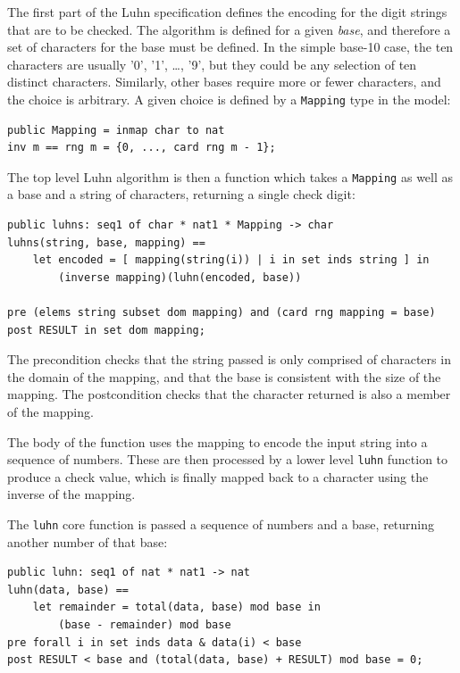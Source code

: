 \documentclass{overturerepchap}
\begin{document}
The first part of the Luhn specification defines the encoding for the digit
strings that are to be checked. The algorithm is defined for a given
\emph{base}, and therefore a set of characters for the base must be defined. In
the simple base-10 case, the ten characters are usually '0', '1', \ldots, '9',
but they could be any selection of ten distinct characters. Similarly, other
bases require more or fewer characters, and the choice is arbitrary. A given
choice is defined by a \texttt{Mapping} type in the model:

\small
\begin{lstlisting}
public Mapping = inmap char to nat
inv m == rng m = {0, ..., card rng m - 1};
\end{lstlisting}
\normalsize

\noindent The top level Luhn algorithm is then a function which takes a
\texttt{Mapping} as well as a base and a string of characters, returning a
single check digit:

\small
\begin{lstlisting}
public luhns: seq1 of char * nat1 * Mapping -> char
luhns(string, base, mapping) ==
    let encoded = [ mapping(string(i)) | i in set inds string ] in
        (inverse mapping)(luhn(encoded, base))

pre (elems string subset dom mapping) and (card rng mapping = base)
post RESULT in set dom mapping;
\end{lstlisting}
\normalsize

\noindent The precondition checks that the string passed is only comprised of characters
in the domain of the mapping, and that the base is consistent with the size of
the mapping. The postcondition checks that the character returned is also a
member of the mapping.

The body of the function uses the mapping to encode the input string into a
sequence of numbers. These are then processed by a lower level \texttt{luhn}
function to produce a check value, which is finally mapped back to a character
using the inverse of the mapping.

The \texttt{luhn} core function is passed a sequence of numbers and a base,
returning another number of that base:

\small
\begin{lstlisting}
public luhn: seq1 of nat * nat1 -> nat
luhn(data, base) ==
    let remainder = total(data, base) mod base in
        (base - remainder) mod base
pre forall i in set inds data & data(i) < base
post RESULT < base and (total(data, base) + RESULT) mod base = 0;
\end{lstlisting}
\normalsize
\end{document}
